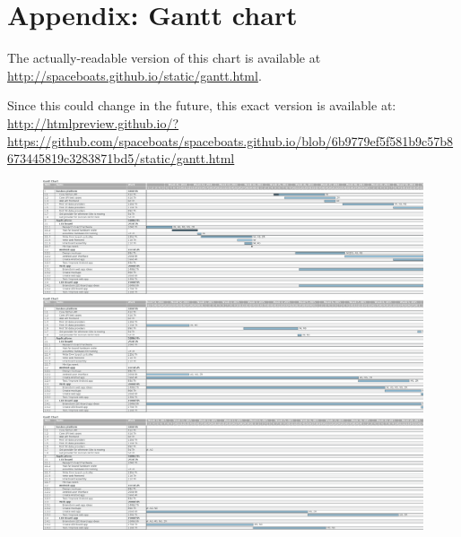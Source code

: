\documentclass[12pt]{article}
\begin{document}
\section{Appendix: Gantt chart}
\label{app:gantt}

The actually-readable version of this chart is available at \url{http://spaceboats.github.io/static/gantt.html}.

Since this could change in the future, this exact version is available at: \\
\url{http://htmlpreview.github.io/?https://github.com/spaceboats/spaceboats.github.io/blob/6b9779ef5f581b9c57b8673445819c3283871bd5/static/gantt.html}

\begin{figure}[h]
	\includegraphics[width=\textwidth]{gantt1.png}
	\\
	\includegraphics[width=\textwidth]{gantt2.png}
	\\
	\includegraphics[width=\textwidth]{gantt3.png}
\end{figure}
\end{document}
